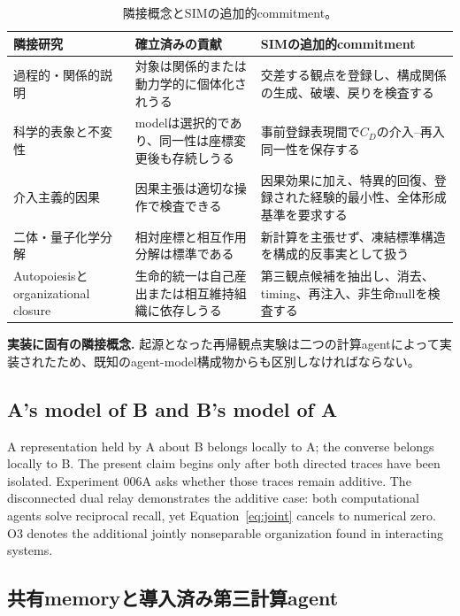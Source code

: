 \documentclass[11pt,a4paper]{article}
\begin{document}
\begin{table}[H]
\centering
\scriptsize
\caption{隣接概念とSIMの追加的commitment。}
\label{tab:prior-boundary}
\begin{tabularx}{\textwidth}{@{}>{\raggedright\arraybackslash}p{3.0cm}>{\raggedright\arraybackslash}p{4.4cm}>{\raggedright\arraybackslash}X@{}}
\toprule
隣接研究 & 確立済みの貢献 & SIMの追加的commitment \\
\midrule
過程的・関係的説明 & 対象は関係的または動力学的に個体化されうる & 交差する観点を登録し、構成関係の生成、破壊、戻りを検査する \\
科学的表象と不変性 & modelは選択的であり、同一性は座標変更後も存続しうる & 事前登録表現間で$C_D$の介入--再入同一性を保存する \\
介入主義的因果 & 因果主張は適切な操作で検査できる & 因果効果に加え、特異的回復、登録された経験的最小性、全体形成基準を要求する \\
二体・量子化学分解 & 相対座標と相互作用分解は標準である & 新計算を主張せず、凍結標準構造を構成的反事実として扱う \\
Autopoiesisとorganizational closure & 生命的統一は自己産出または相互維持組織に依存しうる & 第三観点候補を抽出し、消去、timing、再注入、非生命nullを検査する \\
\bottomrule
\end{tabularx}
\end{table}

\noindent\textbf{実装に固有の隣接概念.}
起源となった再帰観点実験は二つの計算agentによって実装されたため、既知のagent-model構成物からも区別しなければならない。

\subsection{A's model of B and B's model of A}

A representation held by A about B belongs locally to A; the converse belongs locally to B. The present claim begins only after both directed traces have been isolated. Experiment 006A asks whether those traces remain additive. The disconnected dual relay demonstrates the additive case: both computational agents solve reciprocal recall, yet Equation~\eqref{eq:joint} cancels to numerical zero. O3 denotes the additional jointly nonseparable organization found in interacting systems.

\subsection{共有memoryと導入済み第三計算agent}
\end{document}
